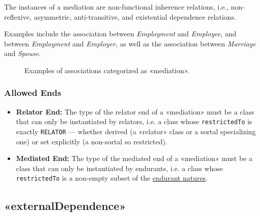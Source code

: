 The instances of a mediation are non-functional inherence relations, i.e., non-reflexive, asymmetric, anti-transitive, and existential dependence relations.

Examples include the association between \textit{Employment} and \textit{Employee}, and between \textit{Employment} and \textit{Employer}, as well as the association between \textit{Marriage} and \textit{Spouse}.

\begin{figure}[h]
    \centering
    
    \caption{Examples of associations categorized as «mediation».}
    \label{fig:mediation-example}
\end{figure}

\subsubsection{Allowed Ends}

\begin{itemize}
    \item \textbf{Relator End:} The type of the relator end of a «mediation» must be a class that can only be instantiated by relators, i.e. a class whose  \texttt{restrictedTo} is exactly \texttt{{RELATOR}} — whether derived (a «relator» class or a sortal specializing one) or set explicitly (a non-sortal so restricted).
    \item \textbf{Mediated End:} The type of the mediated end of a «mediation» must be a class that can only be instantiated by endurants, i.e. a class whose  \texttt{restrictedTo} is a non-empty subset of the \hyperref[par:endurant-nature]{endurant natures}.
\end{itemize}







\subsection{«externalDependence»}
\label{stereotype:externalDependence}

